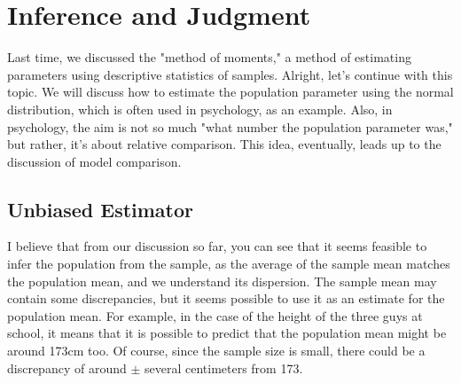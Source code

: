 \documentclass{ltjsbook}
\begin{document}
\chapter{Inference and Judgment}
\label{m17_estimation_and_test}
Last time, we discussed the "method of moments," a method of estimating parameters using descriptive statistics of samples.
Alright, let's continue with this topic. We will discuss how to estimate the population parameter using the normal distribution, which is often used in psychology, as an example.
Also, in psychology, the aim is not so much "what number the population parameter was," but rather, it's about relative comparison. This idea, eventually, leads up to the discussion of model comparison.

\section{Unbiased Estimator}
I believe that from our discussion so far, you can see that it seems feasible to infer the population from the sample, as the average of the sample mean matches the population mean, and we understand its dispersion. The sample mean may contain some discrepancies, but it seems possible to use it as an estimate for the population mean. For example, in the case of the height of the three guys at school, it means that it is possible to predict that the population mean might be around 173cm too. Of course, since the sample size is small, there could be a discrepancy of around $\pm$ several centimeters from 173.
\end{document}
